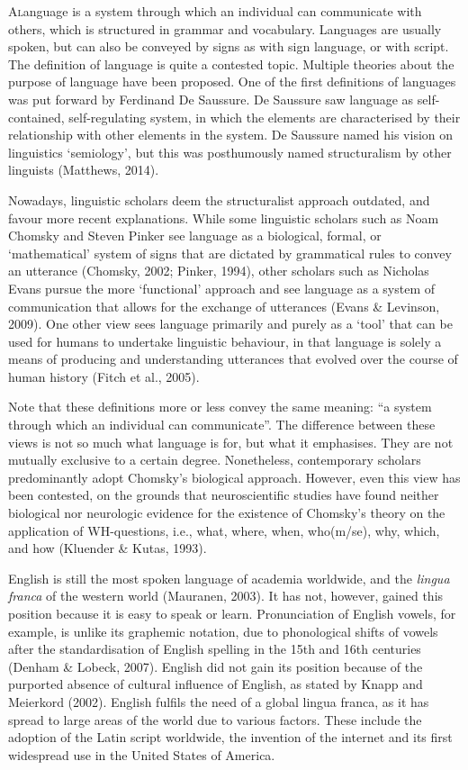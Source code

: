 
\lettrine{A} language is a system through which an individual can communicate with others, which is structured in grammar and vocabulary. Languages are usually spoken, but can also be conveyed by signs as with sign language, or with script. The definition of language is quite a contested topic. Multiple theories about the purpose of language have been proposed. One of the first definitions of languages was put forward by Ferdinand De Saussure. De Saussure saw language as self-contained, self-regulating system, in which the elements are characterised by their relationship with other elements in the system. De Saussure named his vision on linguistics ‘semiology’, but this was posthumously named structuralism by other linguists (Matthews, 2014). 

Nowadays, linguistic scholars deem the structuralist approach outdated, and favour more recent explanations. While some linguistic scholars such as Noam Chomsky and Steven Pinker see language as a biological, formal, or ‘mathematical’ system of signs that are dictated by grammatical rules to convey an utterance (Chomsky, 2002; Pinker, 1994), other scholars such as Nicholas Evans pursue the more ‘functional’ approach and see language as a system of communication that allows for the exchange of utterances (Evans \& Levinson, 2009). One other view sees language primarily and purely as a ‘tool’ that can be used for humans to undertake linguistic behaviour, in that language is solely a means of producing and understanding utterances that evolved over the course of human history (Fitch et al., 2005). 

Note that these definitions more or less convey the same meaning: “a system through which an individual can communicate”. The difference between these views is not so much what language is for, but what it emphasises. They are not mutually exclusive to a certain degree. Nonetheless, contemporary scholars predominantly adopt Chomsky's biological approach. However, even this view has been contested, on the grounds that neuroscientific studies have found neither biological nor neurologic evidence for the existence of Chomsky’s theory on the application of WH-questions, i.e., what, where, when, who(m/se), why, which, and how (Kluender \& Kutas, 1993). 

English is still the most spoken language of academia worldwide, and the \textit{lingua franca} of the western world (Mauranen, 2003). It has not, however, gained this position because it is easy to speak or learn. Pronunciation of English vowels, for example, is unlike its graphemic notation, due to phonological shifts of vowels after the standardisation of English spelling in the 15th and 16th centuries (Denham \& Lobeck, 2007). English did not gain its position because of the purported absence of cultural influence of English, as stated by Knapp and Meierkord (2002). English fulfils the need of a global lingua franca, as it has spread to large areas of the world due to various factors. These include the adoption of the Latin script worldwide, the invention of the internet and its first widespread use in the United States of America. 

